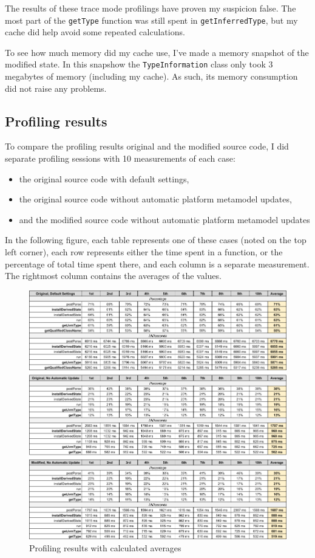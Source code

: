 \documentclass[11pt,a4paper,oneside]{report}
\begin{document}
The results of these trace mode profilings have proven my suspicion false. The
most part of the \texttt{getType} function was still spent in
\texttt{getInferredType}, but my cache did help avoid some repeated
calculations.

To see how much memory did my cache use, I've made a memory snapshot of the
modified state. In this snapshow the \texttt{TypeInformation} class only took
3 megabytes of memory (including my cache). As such, its memory consumption did
not raise any problems.

\subsection{Profiling results}
To compare the profiling results original and the modified source code, I did
separate profiling sessions with 10 measurements of each case:
\begin{itemize}
    \item{the original source code with default settings,}
    \item{the original source code without automatic platform metamodel updates,}
    \item{and the modified source code without automatic platform metamodel updates}
\end{itemize}

In the following figure, each table represents one of these cases (noted on the
top left corner), each row represents either the time spent in a function, or
the percentage of total time spent there, and each column is a separate
measurement. The rightmost column contains the averages of the values.

\begin{figure}[ht]
\centering
\includegraphics[width=150mm,keepaspectratio]{figures/measurements.png}
\caption{Profiling results with calculated averages}
\label{fig:profiling-measurements}
\end{figure}
\end{document}
